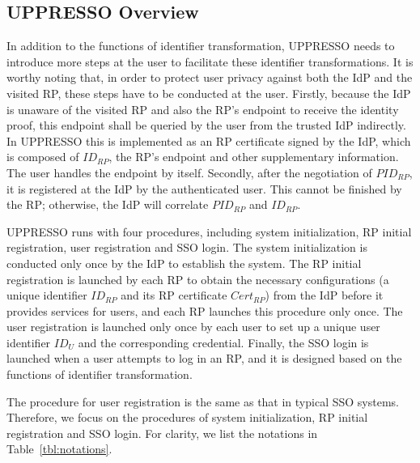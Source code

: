 \subsection{UPPRESSO Overview}
\label{implementations}
In addition to the functions of identifier transformation,
    UPPRESSO needs to introduce more steps at the user to facilitate these identifier transformations.
It is worthy noting that,
    in order to protect user privacy against both the IdP and the visited RP,
        these steps have to be conducted at the user.
Firstly,
    because the IdP is unaware of the visited RP and also the RP's endpoint to receive the identity proof,
        this endpoint shall be queried by the user from the trusted IdP indirectly.
In UPPRESSO this is implemented as an RP certificate signed by the IdP,
    which is composed of $ID_{RP}$, the RP's endpoint and other supplementary information.
The user handles the endpoint by itself.
Secondly,
    after the negotiation of $PID_{RP}$,
        it is registered at the IdP by the authenticated user.
This cannot be finished by the RP; otherwise,
    the IdP will correlate $PID_{RP}$ and $ID_{RP}$.


UPPRESSO runs with four procedures, including system initialization, RP initial registration, user registration and SSO login.
The system initialization is conducted only once by the IdP to establish the system.
The RP initial registration is launched by each RP to obtain the necessary configurations (a unique identifier $ID_{RP}$ and its RP certificate $Cert_{RP}$) from the IdP before it provides services for users,
    and each RP launches this procedure only once.
The user registration is launched only once by each user to set up a unique user identifier $ID_U$ and the corresponding credential.
Finally, the SSO login is launched when a user attempts to log in an RP,
    and it is designed based on the functions of identifier transformation.

The procedure for user registration is the same as that in typical SSO systems.
Therefore, we focus on the procedures of system initialization, RP initial registration and SSO login.
For clarity, we list the notations in Table~\ref{tbl:notations}.

